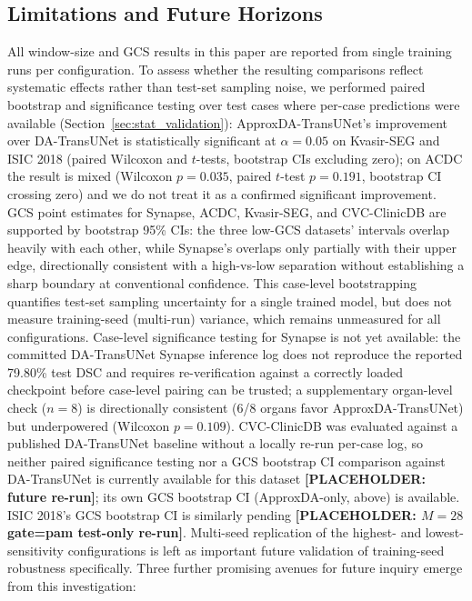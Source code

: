 \subsection{Limitations and Future Horizons}
All window-size and GCS results in this paper are reported from single training runs per configuration. To assess whether the resulting comparisons reflect systematic effects rather than test-set sampling noise, we performed paired bootstrap and significance testing over test cases where per-case predictions were available (Section~\ref{sec:stat_validation}): ApproxDA-TransUNet's improvement over DA-TransUNet is statistically significant at $\alpha{=}0.05$ on Kvasir-SEG and ISIC 2018 (paired Wilcoxon and $t$-tests, bootstrap CIs excluding zero); on ACDC the result is mixed (Wilcoxon $p{=}0.035$, paired $t$-test $p{=}0.191$, bootstrap CI crossing zero) and we do not treat it as a confirmed significant improvement. GCS point estimates for Synapse, ACDC, Kvasir-SEG, and CVC-ClinicDB are supported by bootstrap 95\% CIs: the three low-GCS datasets' intervals overlap heavily with each other, while Synapse's overlaps only partially with their upper edge, directionally consistent with a high-vs-low separation without establishing a sharp boundary at conventional confidence. This case-level bootstrapping quantifies test-set sampling uncertainty for a single trained model, but does not measure training-seed (multi-run) variance, which remains unmeasured for all configurations. Case-level significance testing for Synapse is not yet available: the committed DA-TransUNet Synapse inference log does not reproduce the reported 79.80\% test DSC and requires re-verification against a correctly loaded checkpoint before case-level pairing can be trusted; a supplementary organ-level check ($n{=}8$) is directionally consistent (6/8 organs favor ApproxDA-TransUNet) but underpowered (Wilcoxon $p{=}0.109$). CVC-ClinicDB was evaluated against a published DA-TransUNet baseline without a locally re-run per-case log, so neither paired significance testing nor a GCS bootstrap CI comparison against DA-TransUNet is currently available for this dataset \textbf{[PLACEHOLDER: future re-run]}; its own GCS bootstrap CI (ApproxDA-only, above) is available. ISIC 2018's GCS bootstrap CI is similarly pending \textbf{[PLACEHOLDER: $M{=}28$ gate=pam test-only re-run]}. Multi-seed replication of the highest- and lowest-sensitivity configurations is left as important future validation of training-seed robustness specifically. Three further promising avenues for future inquiry emerge from this investigation:
